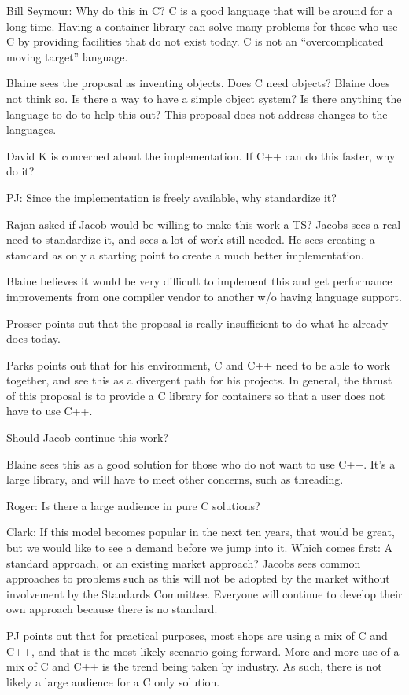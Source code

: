\documentclass[12pt,a4paper,openany]{memoir} %
\begin{document}
{{Bill Seymour: Why do this in C? C is a good language that will be around for a long time. Having a container library can solve many problems for those who use C by providing facilities that do not exist today. C is not an “overcomplicated moving target” language.

Blaine sees the proposal as inventing objects. Does C need objects? Blaine does not think so. Is there a way to have a simple object system? Is there anything the language to do to help this out? 
This proposal does not address changes to the languages.

David K is concerned about the implementation. If C++ can do this faster, why do it? 

PJ: Since the implementation is freely available, why standardize it?

Rajan asked if Jacob would be willing to make this work a TS? Jacobs sees a real need to standardize it, and sees a lot of work still needed. He sees creating a standard as only a starting point to create a much better implementation.

Blaine believes it would be very difficult to implement this and get performance improvements from one compiler vendor to another w/o having language support.

Prosser points out that the proposal is really insufficient to do what he already does today.

Parks points out that for his environment, C and C++ need to be able to work together, and see this as a divergent path for his projects.
In general, the thrust of this proposal is to provide a C library for containers so that a user does not have to use C++. 

Should Jacob continue this work?\par
Blaine sees this as a good solution for those who do not want to use C++. It’s a large library, and will have to meet other concerns, such as threading.

Roger: Is there a large audience in pure C solutions?

Clark: If this model becomes popular in the next ten years, that would be great, but we would like to see a demand before we jump into it.
Which comes first: A standard approach, or an existing market approach? Jacobs sees common approaches to problems such as this will not be adopted by the market without involvement by the Standards Committee. Everyone will continue to develop their own approach because there is no standard.

PJ points out that for practical purposes, most shops are using a mix of C and C++, and that is the most likely scenario going forward. More and more use of a mix of C and C++ is the trend being taken by industry. As such, there is not likely a large audience for a C only solution.

}}
\end{document}
